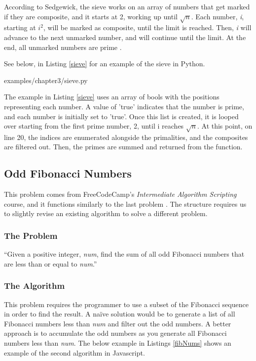 \documentclass[12pt, oneside, a4paper]{book}
\begin{document}
         According to Sedgewick, the sieve works on an array of numbers that get marked if they are composite, and it starts at 2, working up until $\sqrt{n}$.
         Each number, \textit{i}, starting at \textit{$i^2$}, will be marked as composite, until the limit is reached.
         Then, \textit{i} will advance to the next unmarked number, and will continue until the limit.
         At the end, all unmarked numbers are prime \autocite{sedgewickAlgorithms1992}.

         See below, in Listing \ref{sieve} for an example of the sieve in Python.
         
         {examples/chapter3/sieve.py}

         The example in Listing \ref{sieve} uses an array of bools with the positions representing each number.
         A value of 'true' indicates that the number is prime, and each number is initially set to 'true'.
         Once this list is created, it is looped over starting from the first prime number, 2, until i reaches $\sqrt{n}$.
         At this point, on line 20, the indices are enumerated alongside the primalities, and the composites are filtered out.
         Then, the primes are summed and returned from the function.

         \subsection{Odd Fibonacci Numbers}
         This problem comes from FreeCodeCamp's \textit{Intermediate Algorithm Scripting} course, and it functions similarly to the last problem \autocite{freecodecampLearnIntermediateAlgorithm}.
         The structure requires us to slightly revise an existing algorithm to solve a different problem.

         \subsubsection{The Problem}
         ``Given a positive integer, \textit{num}, find the sum of all odd Fibonacci numbers that are less than or equal to \textit{num}.''

         \subsubsection{The Algorithm}
         This problem requires the programmer to use a subset of the Fibonacci sequence in order to find the result.
         A naïve solution would be to generate a list of all Fibonacci numbers less than \textit{num} and filter out the odd numbers.
         A better approach is to accumulate the odd numbers as you generate all Fibonacci numbers less than \textit{num}.
         The below example in Listings \ref{fibNums} shows an example of the second algorithm in Javascript.
\end{document}
